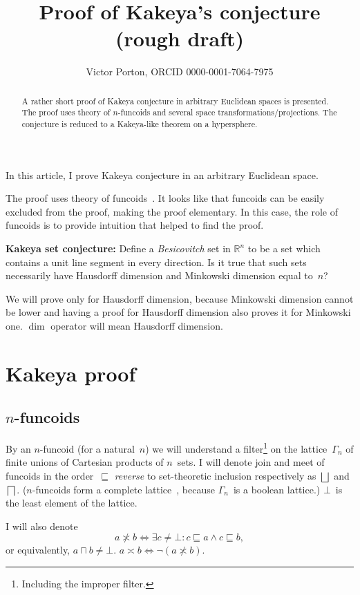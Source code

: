 \documentclass[oneside,draft]{amsart}
\title{Proof of Kakeya's conjecture (rough draft)}
\author{Victor Porton, ORCID 0000-0001-7064-7975}
\newcommand{\intrs}{\not\asymp}
\newcommand{\nintrs}{\asymp}
\begin{document}
\begin{abstract}
A rather short proof of Kakeya conjecture in arbitrary Euclidean spaces is presented. The proof uses theory of $n$-fun\-co\-ids and several space transformations/projections. The conjecture is reduced to a Ka\-ke\-ya-li\-ke theorem on a hypersphere.
\end{abstract}

\maketitle  

In this article, I prove Kakeya conjecture in an arbitrary Euclidean space.

The proof uses theory of funcoids~\cite{volume-1}. It looks like that funcoids can be easily excluded from the proof, making the proof elementary. In this case, the role of funcoids is to provide intuition that helped to find the proof.

\textbf{Kakeya set conjecture:} \cite{kakeya-long,tao-blog-kakeya} Define a \emph{Besicovitch} set in $\mathbb{R}^n$ to be a set which contains a unit line segment in every direction. Is it true that such sets necessarily have Hausdorff dimension and Minkowski dimension equal to~$n$?

We will prove only for Hausdorff dimension, because Minkowski dimension cannot be lower and having a proof for Hausdorff dimension also proves it for Minkowski one. $\dim$ operator will mean Hausdorff dimension.

\section{Kakeya proof}

\subsection{$n$-fun\-co\-ids}

By an $n$-fun\-co\-id (for a natural~$n$) we will understand a filter\footnote{Including the improper filter.} on the lattice~$\Gamma_n$ of finite unions of Cartesian products of $n$~sets. I will denote join and meet of funcoids in the order~$\sqsubseteq$ \emph{reverse} to set-the\-o\-re\-tic inclusion respectively as $\bigsqcup$ and $\bigsqcap$. ($n$-fun\-co\-ids form a complete lattice~\cite{volume-1}, because $\Gamma_n$~is a boolean lattice.) $\bot$~is the least element of the lattice.

I will also denote \[ a\intrs b \Leftrightarrow \exists c\ne\bot: c\sqsubseteq a\land c\sqsubseteq b, \] or equivalently, $a\sqcap b\ne\bot$.
$a\nintrs b\Leftrightarrow\lnot(a\intrs b)$.
\end{document}
